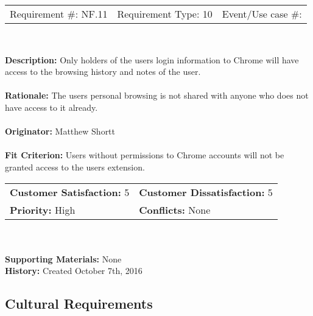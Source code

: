 \documentclass[12pt, titlepage]{article}
\begin{document}
\begin{framed}
	
	\begin{center}
		
		\begin{tabular}{ l c r }
			Requirement \#: NF.11 & Requirement Type: 10 & Event/Use case \#: \\
		\end{tabular} \\
	\end{center}
	\textbf{Description:} Only holders of the users login information to Chrome will have 
	access to the browsing history and notes of the user.\\
	\\
	\textbf{Rationale:} The users personal browsing is not shared with anyone who does 
	not have access to it already.  \\
	\\
	\textbf{Originator:} Matthew Shortt \\
	\\
	\textbf{Fit Criterion:} Users without permissions to Chrome accounts will not be 
	granted access to the users extension. 
	\\
	
	\begin{tabular}{ll}
		\textbf{Customer Satisfaction:} 5 & \textbf{Customer Dissatisfaction:} 5 \\
		\textbf{Priority:} High & \textbf{Conflicts:} None\\
	\end{tabular} \\
	\\
	\textbf{Supporting Materials:} None \\
	\textbf{History:} Created October 7th, 2016
	
\end{framed}

\subsection{Cultural Requirements}
\end{document}

